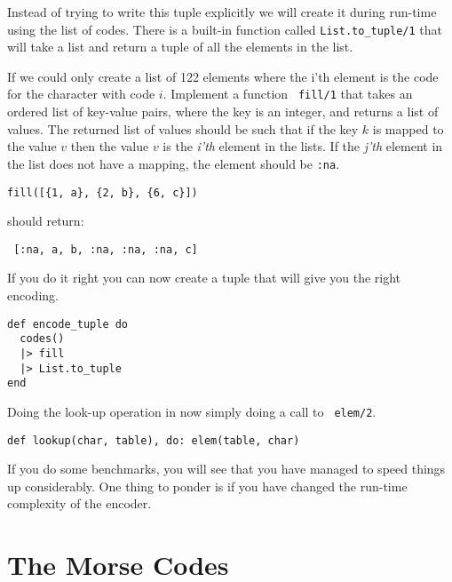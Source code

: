 \documentclass[a4paper,11pt]{article}
\newcommand{\nnsection}[1]{
\section*{#1}
\addcontentsline{toc}{section}{#1}
}
\begin{document}
Instead of trying to write this tuple explicitly we will create it
during run-time using the list of codes. There is a built-in function
called {\tt List.to\_tuple/1} that will take a list and return a
tuple of all the elements in the list.

If we could only create a list of 122 elements where the i'th element
is the code for the character with code $i$. Implement a function {\tt
  fill/1} that takes an ordered list of key-value pairs, where the
key is an integer, and returns a list of values. The returned list of
values should be such that if the key $k$ is mapped to the value $v$
then the value $v$ is the {\em i'th} element in the lists. If the {\em
  j'th} element in the list does not have a mapping, the element
should be {\tt :na}.

\begin{verbatim}
fill([{1, a}, {2, b}, {6, c}])
\end{verbatim}

should return:

\begin{verbatim}
 [:na, a, b, :na, :na, :na, c]
\end{verbatim}

If you do it right you can now create a tuple that will give you the
right encoding.

\begin{verbatim}
def encode_tuple do
  codes()
  |> fill
  |> List.to_tuple
end
\end{verbatim}

Doing the look-up operation in now simply doing a call to {\tt
  elem/2}.

\begin{verbatim}
def lookup(char, table), do: elem(table, char)
\end{verbatim}

If you do some benchmarks, you will see that you have managed to
speed things up considerably. One thing to ponder is if you have
changed the run-time complexity of the encoder.

\newpage
\nnsection{The Morse Codes}
\end{document}
